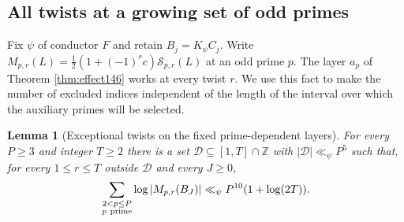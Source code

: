 \documentclass[a4paper,11pt]{article}
\newtheorem{lemma}[proposition]{Lemma}
\theoremstyle{definition}
\theoremstyle{remark}
\newcommand{\ZZ}{\mathbb Z}\newcommand{\ord}{\operatorname{ord}}
\numberwithin{equation}{section}
\newcommand{\Sel}{\mathcal S}
\begin{document}
\subsection{All twists at a growing set of odd primes}\label{nav:II-18}
\label{sec:log147}

Fix \(\psi\) of conductor \(F\) and retain \(B_j=K_\psi C_j\).
Write \(M_{p,r}(L)=\tfrac12(1+(-1)^r c)\Sel_{p,r}(L)\) at
an odd prime \(p\). The layer \(a_p\) of
Theorem \ref{thm:effect146}
works at every twist \(r\). We use this fact to make the number
of excluded indices independent of the length of the interval
over which the auxiliary primes will be selected.

\begin{lemma}[Exceptional twists on the fixed prime-dependent layers]
\label{lem:budget147}
For every \(P\ge3\) and integer \(T\ge2\) there is a set
\(\mathcal D\subseteq[1,T]\cap\ZZ\) with
\(|\mathcal D|\ll_\psi P^5\) such that, for every \(1\le r\le T\)
outside \(\mathcal D\) and every \(J\ge0\),
\begin{equation}
      \sum_{\substack{2<p\le P\\p\ {\rm prime}}}
           \log|M_{p,r}(B_J)|
          \ll_\psi P^{10}(1+\log(2T)).
      \label{eq:budget147}
\end{equation}
\end{lemma}
\end{document}
